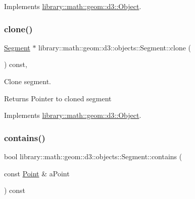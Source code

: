 Implements \hyperlink{classlibrary_1_1math_1_1geom_1_1d3_1_1_object_a5fc47b1ee5d9a28efc6010d3d1512470}{library\+::math\+::geom\+::d3\+::\+Object}.

\mbox{\label{classlibrary_1_1math_1_1geom_1_1d3_1_1objects_1_1_segment_a589ad56339616f362cee84a2ecab61a4}} 
\subsubsection{\texorpdfstring{clone()}{clone()}}
{\footnotesize\ttfamily \hyperlink{classlibrary_1_1math_1_1geom_1_1d3_1_1objects_1_1_segment}{Segment} $\ast$ library\+::math\+::geom\+::d3\+::objects\+::\+Segment\+::clone (\begin{DoxyParamCaption}{ }\end{DoxyParamCaption}) const\hspace{0.3cm}{\ttfamily [override]}, {\ttfamily [virtual]}}



Clone segment. 

\begin{DoxyReturn}{Returns}
Pointer to cloned segment 
\end{DoxyReturn}


Implements \hyperlink{classlibrary_1_1math_1_1geom_1_1d3_1_1_object_a1a784c6b359e0eb97cd34fabc42f2f3f}{library\+::math\+::geom\+::d3\+::\+Object}.

\mbox{\label{classlibrary_1_1math_1_1geom_1_1d3_1_1objects_1_1_segment_aabdbcd6bbfbe9350fe53f1b3563b5652}} 
\subsubsection{\texorpdfstring{contains()}{contains()}}
{\footnotesize\ttfamily bool library\+::math\+::geom\+::d3\+::objects\+::\+Segment\+::contains (\begin{DoxyParamCaption}\item[{const \hyperlink{classlibrary_1_1math_1_1geom_1_1d3_1_1objects_1_1_point}{Point} \&}]{a\+Point }\end{DoxyParamCaption}) const}



